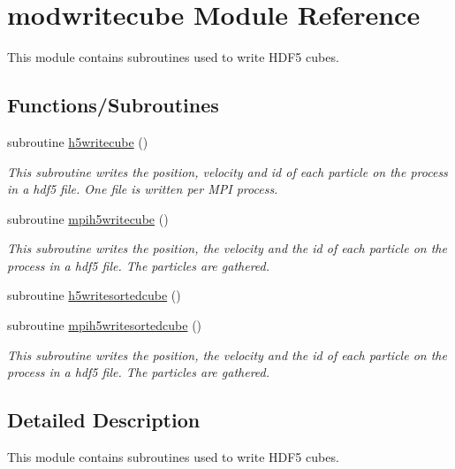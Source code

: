 \hypertarget{namespacemodwritecube}{}\section{modwritecube Module Reference}
\label{namespacemodwritecube}


This module contains subroutines used to write H\+D\+F5 cubes.  


\subsection*{Functions/\+Subroutines}
\begin{DoxyCompactItemize}
\item 
subroutine \hyperlink{namespacemodwritecube_a99b5a6f7f4534196e666b125702c093f}{h5writecube} ()
\begin{DoxyCompactList}\small\item\em This subroutine writes the position, velocity and id of each particle on the process in a hdf5 file. One file is written per M\+PI process. \end{DoxyCompactList}\item 
subroutine \hyperlink{namespacemodwritecube_a0d94e39019f7808f3f373281ffe696a8}{mpih5writecube} ()
\begin{DoxyCompactList}\small\item\em This subroutine writes the position, the velocity and the id of each particle on the process in a hdf5 file. The particles are gathered. \end{DoxyCompactList}\item 
subroutine \hyperlink{namespacemodwritecube_a8af2220dcc73a35204f76527d4559e52}{h5writesortedcube} ()
\item 
subroutine \hyperlink{namespacemodwritecube_a491b7602123b1ac2d10637eb7c73ce77}{mpih5writesortedcube} ()
\begin{DoxyCompactList}\small\item\em This subroutine writes the position, the velocity and the id of each particle on the process in a hdf5 file. The particles are gathered. \end{DoxyCompactList}\end{DoxyCompactItemize}


\subsection{Detailed Description}
This module contains subroutines used to write H\+D\+F5 cubes. 


